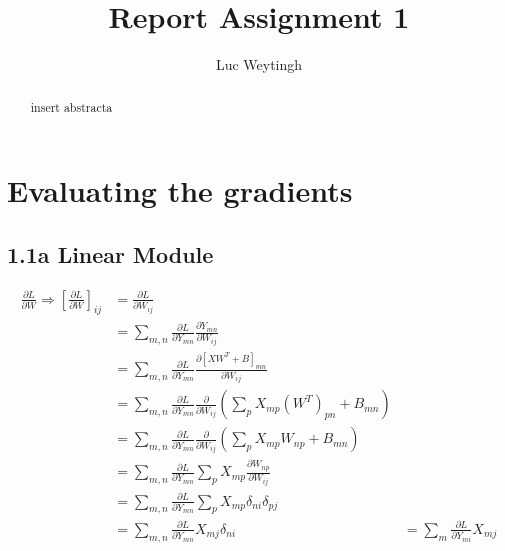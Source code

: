 \documentclass{article}
\title{Report Assignment 1}
\author{%
  Luc Weytingh
}
\begin{document}
\maketitle

\begin{abstract}
  insert abstracta
\end{abstract}

\section{Evaluating the gradients}

\subsection*{1.1a Linear Module}
\begin{align*}
  \frac{\partial L}{\partial W} \Rightarrow \left[\frac{\partial L}{\partial W}\right]_{ij} &= \frac{\partial L}{\partial W_{ij}}\\
                                                                                            &= \sum_{m,n}\frac{\partial L}{\partial Y_{mn}} \frac{\partial Y_{mn}}{\partial W_{ij}} \\
  &= \sum_{m,n}\frac{\partial L}{\partial Y_{mn}} \frac{\partial [XW^T + B]_{mn}}{\partial W_{ij}} \\
                                                                                            &= \sum_{m,n}\frac{\partial L}{\partial Y_{mn}} \frac{\partial}{\partial W_{ij}} \left(\sum_p X_{mp} (W^T)_{pn} + B_{mn}\right) \\
                                                                                            &= \sum_{m,n}\frac{\partial L}{\partial Y_{mn}} \frac{\partial}{\partial W_{ij}} \left(\sum_p X_{mp} W_{np} + B_{mn}\right) \\
                                                                                            &= \sum_{m,n}\frac{\partial L}{\partial Y_{mn}}  \sum_p X_{mp} \frac{\partial W_{np}}{\partial W_{ij}} \\
                                                                                            &= \sum_{m,n}\frac{\partial L}{\partial Y_{mn}}  \sum_p X_{mp} \delta_{ni}\delta_{pj} \\
                                                                                            &= \sum_{m,n}\frac{\partial L}{\partial Y_{mn}} X_{mj} \delta_{ni}
                                                                                              &= \sum_{m}\frac{\partial L}{\partial Y_{mi}} X_{mj}
\end{align*}
\end{document}
